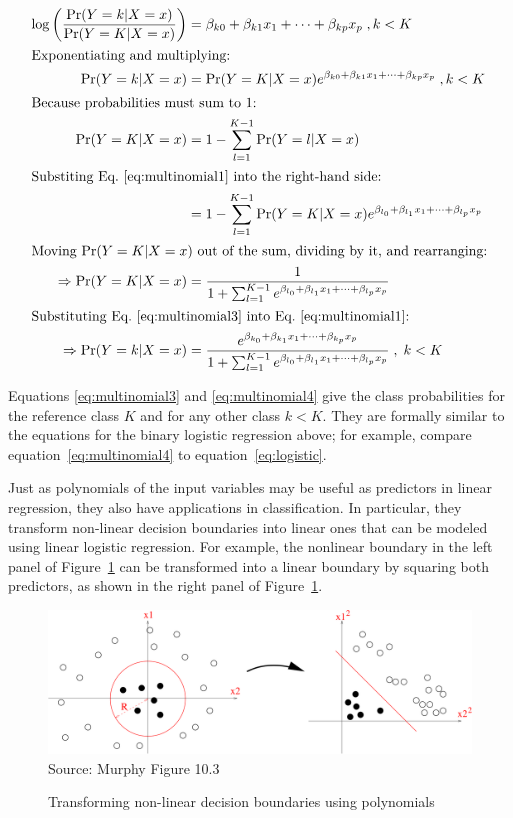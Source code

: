 \begin{align}
\log \left( \frac{\Pr(Y=k | X=x)}{\Pr(Y=K | X=x)}\right) &= \beta_{k0}+\beta_{k1}x_1 + \cdots + \beta_{kp}x_p \; , k<K \nonumber \\
\intertext{Exponentiating and multiplying:}
\Pr(Y=k | X=x) &= \Pr(Y=K | X=x) e^{\beta_{k0}+\beta_{k1}x_1 + \cdots + \beta_{kp}x_p} \;, k<K \label{eq:multinomial1} \\
\intertext{Because probabilities must sum to 1:}
\Pr(Y=K | X=x) &= 1 - \sum_{l=1}^{K-1} \Pr(Y=l | X=x) \nonumber \\
\intertext{Substiting Eq.~\ref{eq:multinomial1} into the right-hand side:}
&= 1 - \sum_{l=1}^{K-1} \Pr(Y=K | X=x) e^{\beta_{l_0}+\beta_{l_1}x_1 + \cdots + \beta_{l_p}x_p} \nonumber \\
\intertext{Moving $\Pr(Y=K|X=x)$ out of the sum, dividing by it, and rearranging:}
\Rightarrow \Pr(Y=K | X = x) &= \frac{1}{1 + \sum_{l=1}^{K-1} e^{\beta_{l_0}+\beta_{l_1}x_1 + \cdots + \beta_{l_p}x_p}} \label{eq:multinomial3} \\
\intertext{Substituting Eq.~\ref{eq:multinomial3} into Eq.~\ref{eq:multinomial1}:}
\Rightarrow \Pr(Y=k|X=x) &= \frac{e^{\beta_{k_0}+\beta_{k_1}x_1 + \cdots + \beta_{k_p}x_p}}{1 + \sum_{l=1}^{K-1} e^{\beta_{l_0}+\beta_{l_1}x_1 + \cdots + \beta_{l_p}x_p}} \;, \; k < K \label{eq:multinomial4} 
\end{align}

Equations \ref{eq:multinomial3} and \ref{eq:multinomial4} give the class probabilities for the reference class $K$ and for any other class $k < K$. They are formally similar to the equations for the binary logistic regression above; for example, compare equation~\ref{eq:multinomial4} to equation~\ref{eq:logistic}.

Just as polynomials of the input variables may be useful as predictors in linear regression, they also have applications in classification. In particular, they transform non-linear decision boundaries into linear ones that can be modeled using linear logistic regression. For example, the nonlinear boundary in the left panel of Figure~\ref{fig:nonlinearboundary} can be transformed into a linear boundary by squaring both predictors, as shown in the right panel of Figure~\ref{fig:nonlinearboundary}.

\begin{figure}
\centering
\includegraphics[width=.8\textwidth]{Figure_10.3.png} \\
\scriptsize Source: Murphy Figure 10.3
\caption{Transforming non-linear decision boundaries using polynomials}
\label{fig:nonlinearboundary}
\end{figure}

